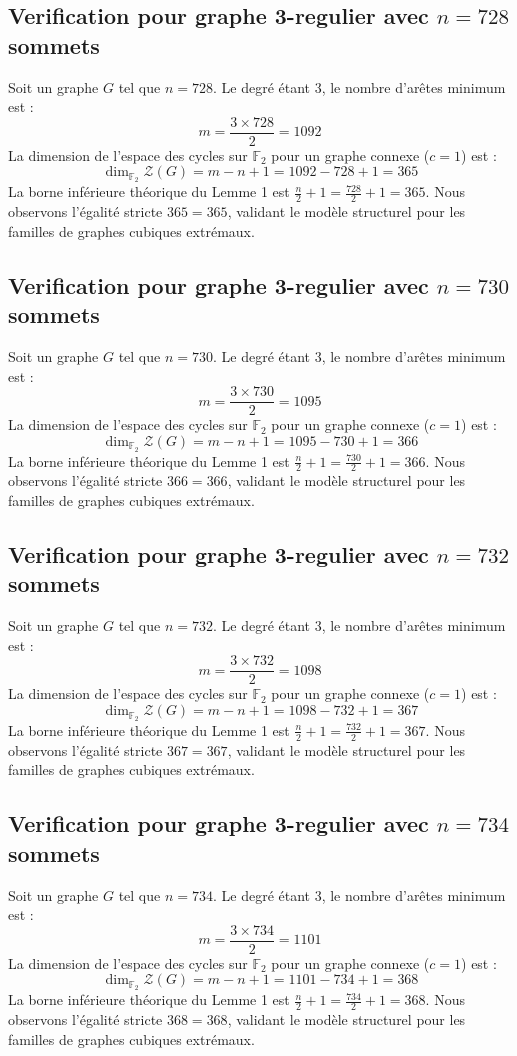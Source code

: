 \documentclass[11pt,a4paper]{article}
\begin{document}
\subsection{Verification pour graphe 3-regulier avec $n=728$ sommets}
Soit un graphe $G$ tel que $n = 728$. Le degré étant 3, le nombre d'arêtes minimum est :
$$ m = \frac{3 \times 728}{2} = 1092 $$
La dimension de l'espace des cycles sur $\mathbb{F}_2$ pour un graphe connexe ($c=1$) est :
$$ \dim_{\mathbb{F}_2} \mathcal{Z}(G) = m - n + 1 = 1092 - 728 + 1 = 365 $$
La borne inférieure théorique du Lemme 1 est $\frac{n}{2} + 1 = \frac{728}{2} + 1 = 365$.
Nous observons l'égalité stricte $365 = 365$, validant le modèle structurel pour les familles de graphes cubiques extrémaux.

\subsection{Verification pour graphe 3-regulier avec $n=730$ sommets}
Soit un graphe $G$ tel que $n = 730$. Le degré étant 3, le nombre d'arêtes minimum est :
$$ m = \frac{3 \times 730}{2} = 1095 $$
La dimension de l'espace des cycles sur $\mathbb{F}_2$ pour un graphe connexe ($c=1$) est :
$$ \dim_{\mathbb{F}_2} \mathcal{Z}(G) = m - n + 1 = 1095 - 730 + 1 = 366 $$
La borne inférieure théorique du Lemme 1 est $\frac{n}{2} + 1 = \frac{730}{2} + 1 = 366$.
Nous observons l'égalité stricte $366 = 366$, validant le modèle structurel pour les familles de graphes cubiques extrémaux.

\subsection{Verification pour graphe 3-regulier avec $n=732$ sommets}
Soit un graphe $G$ tel que $n = 732$. Le degré étant 3, le nombre d'arêtes minimum est :
$$ m = \frac{3 \times 732}{2} = 1098 $$
La dimension de l'espace des cycles sur $\mathbb{F}_2$ pour un graphe connexe ($c=1$) est :
$$ \dim_{\mathbb{F}_2} \mathcal{Z}(G) = m - n + 1 = 1098 - 732 + 1 = 367 $$
La borne inférieure théorique du Lemme 1 est $\frac{n}{2} + 1 = \frac{732}{2} + 1 = 367$.
Nous observons l'égalité stricte $367 = 367$, validant le modèle structurel pour les familles de graphes cubiques extrémaux.

\subsection{Verification pour graphe 3-regulier avec $n=734$ sommets}
Soit un graphe $G$ tel que $n = 734$. Le degré étant 3, le nombre d'arêtes minimum est :
$$ m = \frac{3 \times 734}{2} = 1101 $$
La dimension de l'espace des cycles sur $\mathbb{F}_2$ pour un graphe connexe ($c=1$) est :
$$ \dim_{\mathbb{F}_2} \mathcal{Z}(G) = m - n + 1 = 1101 - 734 + 1 = 368 $$
La borne inférieure théorique du Lemme 1 est $\frac{n}{2} + 1 = \frac{734}{2} + 1 = 368$.
Nous observons l'égalité stricte $368 = 368$, validant le modèle structurel pour les familles de graphes cubiques extrémaux.
\end{document}
